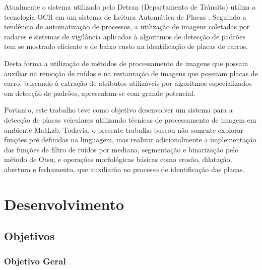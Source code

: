 \documentclass[
	12pt,				%
    oneside,			%
	a4paper,			%
	english,			%
	french,				%
	spanish,			%
	brazil,				%
	]{abntex2}
\begin{document}
Atualmente o sistema utilizado pelo Detran (Departamento de Trânsito) utiliza a tecnologia OCR em um sistema de Leitura Automática de Placas \cite{ming2006fiscalizaccao}. Seguindo a tendência de automatização de processos, a utilização de imagens coletadas por radares e sistemas de vigilância aplicadas à algoritmos de detecção de padrões tem se mostrado eficiente e de baixo custo na identificação de placas de carros. 

Desta forma a utilização de métodos de processamento de imagens que possam auxiliar na remoção de ruídos e na restauração de imagens que possuam placas de carro, buscando à extração de atributos utilizáveis por algoritmos especializados em detecção de padrões, apresentam-se com grande potencial.


Portanto, este trabalho teve como objetivo desenvolver um sistema para a detecção de placas veiculares utilizando técnicas de processamento de imagem em ambiente MatLab. Todavia, o presente trabalho buscou não somente explorar funções pré definidas na linguagem, mas realizar adicionalmente a implementação das funções de filtro de ruídos por mediana, segmentação e binarização pelo método de Otsu, e operações morfológicas básicas como erosão, dilatação, abertura e fechamento, que auxiliarão no processo de identificação das placas. 






\chapter{Desenvolvimento}

\section{Objetivos}

\subsection{Objetivo Geral}
\end{document}
